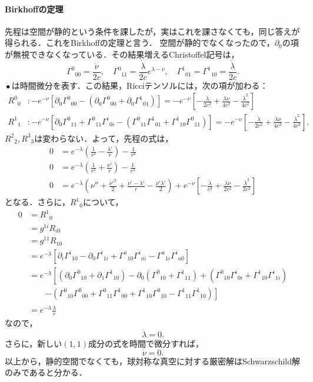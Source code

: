 \documentclass[a4paper]{ltjsreport}
\begin{document}
\paragraph{Birkhoffの定理}
先程は空間が静的という条件を課したが，実はこれを課さなくても，同じ答えが得られる．これをBirkhoffの定理と言う．
空間が静的でなくなったので，$\partial_0$の項が無視できなくなっている．その結果増えるChristoffel記号は，
\[{\Gamma^0}_{00}=\frac{\dot{\nu}}{2c}, \quad{\Gamma^0}_{11}=\frac{\dot{\lambda}}{2c}e^{\lambda - \nu}, \quad{\Gamma^1}_{01}={\Gamma^1}_{10}=\frac{\dot{\lambda}}{2c}.\]
$\dot\bullet$は時間微分を表す．この結果，Ricciテンソルには，次の項が加わる：
\begin{align*}
  {R^0}_0 &\colon -  e^{ - \nu}\left[\partial_0{\Gamma^0}_{00} - (\partial_0{\Gamma^0}_{00} + \partial_0{\Gamma^1}_{01})\right]
  = - e^{ - \nu}\left[ - \frac{\ddot{\lambda}}{2c^2} + \frac{\dot{\lambda}\dot{\nu}}{4c^2} - \frac{\dot{\lambda}^2}{4c^2}\right]\\
  {R^1}_1 &\colon -  e^{ - \nu}\left[\partial_0{\Gamma^0}_{11} + {\Gamma^0}_{11}{\Gamma^i}_{0i} - \left({\Gamma^0}_{11}{\Gamma^1}_{01} + {\Gamma^1}_{10}{\Gamma^0}_{11}\right)\right]
  = - e^{ - \nu}\left[ - \frac{\ddot{\lambda}}{2c^2} + \frac{\dot{\lambda}\dot{\nu}}{4c^2} - \frac{\dot{\lambda}^2}{4c^2}\right] .
\end{align*}
${R^2}_2, {R^3}_3$は変わらない．よって，先程の式は，
\begin{align*}
  0 &= e^{ - \lambda}\left(\frac{1}{r^2} - \frac{\lambda'}{r}\right) - \frac{1}{r^2} \\
  0 &= e^{ - \lambda}\left(\frac{1}{r^2} + \frac{\nu'}{r}\right) - \frac{1}{r^2} \\
  0 &= e^{ - \lambda}\left(\nu'' + \frac{\nu'^2}{2} + \frac{\nu' - \lambda'}{r} - \frac{\nu'\lambda'}{2}\right)
  + e^{ - \nu}\left[ - \frac{\ddot{\lambda}}{c^2} + \frac{\dot{\lambda}\dot{\nu}}{2c^2} - \frac{\dot{\lambda}^2}{2c^2}\right]
\end{align*}
となる．さらに，${R^1}_0$について，
\begin{align*}
  0 &= {R^1}_0\\
  &= g^{1i}R_{i0}\\
  &= g^{11}R_{10}\\
  &= e^{ - \lambda}\left[\partial_i{\Gamma^i}_{10} - \partial_0{\Gamma^i}_{1i} + {\Gamma^a}_{10}{\Gamma^i}_{ai} - {\Gamma^a}_{1i}{\Gamma^i}_{a0}\right]\\
  &= e^{ - \lambda}\left[\left(\partial_0{\Gamma^0}_{10} + \partial_1{\Gamma^1}_{10}\right) - \partial_0\left({\Gamma^0}_{10} + {\Gamma^1}_{11}\right) + \left({\Gamma^0}_{10}{\Gamma^i}_{0i} + {\Gamma^1}_{10}{\Gamma^i}_{1i}\right)\right.\\
  &\qquad\left. - \left({\Gamma^0}_{10}{\Gamma^0}_{00} + {\Gamma^0}_{11}{\Gamma^1}_{00} + {\Gamma^1}_{10}{\Gamma^0}_{10} - {\Gamma^1}_{11}{\Gamma^1}_{10}\right)\right]\\
  &= e^{ - \lambda}\frac{\dot{\lambda}}{r}
\end{align*}
なので，
\[\dot{\lambda}=0.\]
さらに，新しい$(1, 1)$成分の式を時間で微分すれば，
\[\dot{\nu}=0.\]
以上から，静的空間でなくても，球対称な真空に対する厳密解はSchwarzschild解のみであると分かる．
\end{document}
